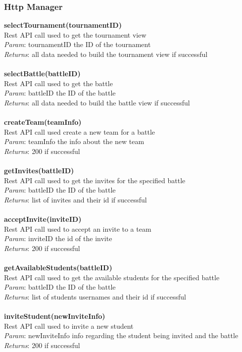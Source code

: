 \documentclass{article}
\begin{document}
\subsubsection{Http Manager}
\textbf{selectTournament(tournamentID)}\\
Rest API call used to get the  tournament view\\
\textit{Param}: tournamentID the ID of the tournament\\
\textit{Returns}: all data needed to build the tournament view if successful\\
\\
\textbf{selectBattle(battleID)}\\
Rest API call used to get the battle\\
\textit{Param}: battleID the ID of the battle\\
\textit{Returns}: all data needed to build the battle view if successful\\
\\
\textbf{createTeam(teamInfo)}\\
Rest API call used create a new team for a battle\\
\textit{Param}: teamInfo the info about the new team\\
\textit{Returns}: 200 if successful\\
\\
\textbf{getInvites(battleID)}\\
Rest API call used to get the invites for the specified battle\\
\textit{Param}: battleID the ID of the battle\\
\textit{Returns}: list of invites and their id if successful\\
\\
\textbf{acceptInvite(inviteID)}\\
Rest API call used to accept an invite to a team\\
\textit{Param}: inviteID the id of the invite\\
\textit{Returns}: 200 if successful\\
\\
\textbf{getAvailableStudents(battleID)}\\
Rest API call used to get the available students for the specified battle\\
\textit{Param}: battleID the ID of the battle\\
\textit{Returns}: list of students usernames and their id if successful\\
\\
\textbf{inviteStudent(newInviteInfo)}\\
Rest API call used to invite a new student\\
\textit{Param}: newInviteInfo info regarding the student being invited and the battle\\
\textit{Returns}: 200 if successful\\
\end{document}
